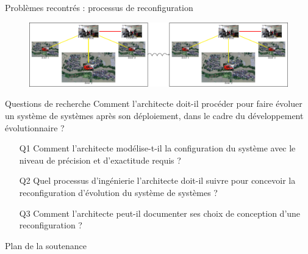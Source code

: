 \begin{frame}{Problèmes recontrés : processus de reconfiguration}
\begin{figure}
\centering
\includegraphics[scale=0.6]{imgs/slide_intro_process.pdf}
\end{figure}
\end{frame}

\begin{frame}{Questions de recherche}
Comment l’architecte doit-il procéder pour faire évoluer un système de systèmes après son déploiement, dans le cadre du développement évolutionnaire ?\\
\begin{itemize}
    \item[Q1] Comment l’architecte modélise-t-il la configuration du système avec le niveau de précision et d’exactitude requis ?
    \item[Q2] Quel processus d’ingénierie l’architecte doit-il suivre pour concevoir la reconfiguration d’évolution du système de systèmes ?
    \item[Q3] Comment l’architecte peut-il documenter ses choix de conception d’une reconfiguration ?
\end{itemize}
\end{frame}

\begin{frame}{Plan de la soutenance}
\tableofcontents
\end{frame}

